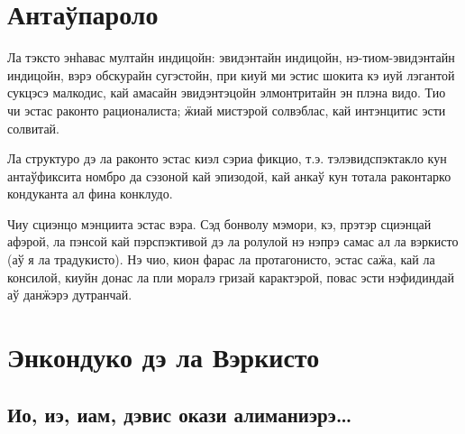 \chapter*{Антаўпароло}

Ла тэксто энһавас мултайн индицойн: эвидэнтайн индицойн, нэ-тиом-эвидэнтайн индицойн, вэрэ обскурайн сугэстойн, при киуй ми эстис шокита кэ иуй лэгантой сукцэсэ малкодис, кай амасайн эвидэнтэцойн элмонтритайн эн плэна видо.
Тио чи эстас раконто рационалиста; ӝиай мистэрой солвэблас, кай интэнцитис эсти солвитай.

Ла структуро дэ ла раконто эстас киэл сэриа фикцио, т.э. тэлэвидспэктакло кун антаўфиксита номбро да сэзоной кай эпизодой, кай анкаў кун тотала раконтарко кондуканта ал фина конклудо.


Чиу сциэнцо мэнциита эстас вэра.
Сэд бонволу мэмори, кэ, прэтэр сциэнцай афэрой, ла пэнсой кай пэрспэктивой дэ ла ролулой нэ нэпрэ самас ал ла вэркисто (аў я ла традукисто).
Нэ чио, кион фарас ла протагонисто, эстас саӝа, кай ла консилой, киуйн донас ла пли моралэ гризай карактэрой, повас эсти нэфидиндай аў данӝэрэ дутранчай.

\chapter*{Энкондуко дэ ла Вэркисто}

\section*{Ио, иэ, иам, дэвис окази алиманиэрэ…}

